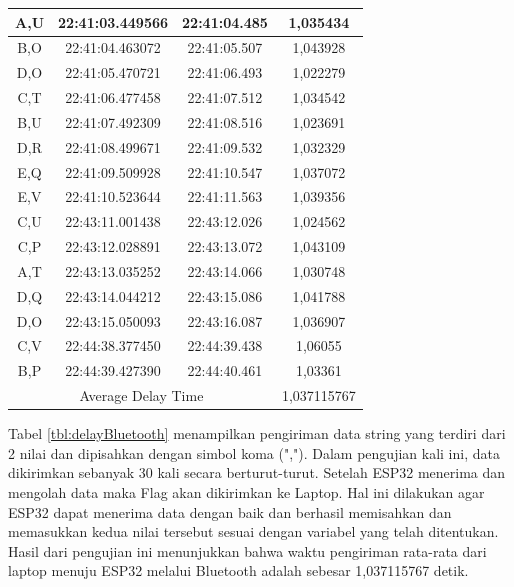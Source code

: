 \begin{longtable}{|ccc|c|}
  \multicolumn{1}{|c|}{A,U}  & \multicolumn{1}{c|}{22:41:03.449566} & 22:41:04.485       & 1,035434    \\ \hline
  \multicolumn{1}{|c|}{B,O}  & \multicolumn{1}{c|}{22:41:04.463072} & 22:41:05.507       & 1,043928    \\ \hline
  \multicolumn{1}{|c|}{D,O}  & \multicolumn{1}{c|}{22:41:05.470721} & 22:41:06.493       & 1,022279    \\ \hline
  \multicolumn{1}{|c|}{C,T}  & \multicolumn{1}{c|}{22:41:06.477458} & 22:41:07.512       & 1,034542    \\ \hline
  \multicolumn{1}{|c|}{B,U}  & \multicolumn{1}{c|}{22:41:07.492309} & 22:41:08.516       & 1,023691    \\ \hline
  \multicolumn{1}{|c|}{D,R}  & \multicolumn{1}{c|}{22:41:08.499671} & 22:41:09.532       & 1,032329    \\ \hline
  \multicolumn{1}{|c|}{E,Q}  & \multicolumn{1}{c|}{22:41:09.509928} & 22:41:10.547       & 1,037072    \\ \hline
  \multicolumn{1}{|c|}{E,V}  & \multicolumn{1}{c|}{22:41:10.523644} & 22:41:11.563       & 1,039356    \\ \hline
  \multicolumn{1}{|c|}{C,U}  & \multicolumn{1}{c|}{22:43:11.001438} & 22:43:12.026       & 1,024562    \\ \hline
  \multicolumn{1}{|c|}{C,P}  & \multicolumn{1}{c|}{22:43:12.028891} & 22:43:13.072       & 1,043109    \\ \hline
  \multicolumn{1}{|c|}{A,T}  & \multicolumn{1}{c|}{22:43:13.035252} & 22:43:14.066       & 1,030748    \\ \hline
  \multicolumn{1}{|c|}{D,Q}  & \multicolumn{1}{c|}{22:43:14.044212} & 22:43:15.086       & 1,041788    \\ \hline
  \multicolumn{1}{|c|}{D,O}  & \multicolumn{1}{c|}{22:43:15.050093} & 22:43:16.087       & 1,036907    \\ \hline
  \multicolumn{1}{|c|}{C,V}  & \multicolumn{1}{c|}{22:44:38.377450} & 22:44:39.438       & 1,06055     \\ \hline
  \multicolumn{1}{|c|}{B,P}  & \multicolumn{1}{c|}{22:44:39.427390} & 22:44:40.461       & 1,03361     \\ \hline
  \multicolumn{3}{|c|}{Average Delay Time}                                               & 1,037115767 \\ \hline
  \end{longtable}

Tabel \ref{tbl:delayBluetooth} menampilkan pengiriman data string yang terdiri dari 2 nilai dan dipisahkan dengan simbol koma (","). Dalam pengujian kali ini, data dikirimkan sebanyak 30 kali secara berturut-turut. Setelah ESP32 menerima dan mengolah data maka Flag akan dikirimkan ke Laptop. Hal ini dilakukan agar ESP32 dapat menerima data dengan baik dan berhasil memisahkan dan memasukkan kedua nilai tersebut sesuai dengan variabel yang telah ditentukan. Hasil dari pengujian ini menunjukkan bahwa waktu pengiriman rata-rata dari laptop menuju ESP32 melalui Bluetooth adalah sebesar 1,037115767 detik.

